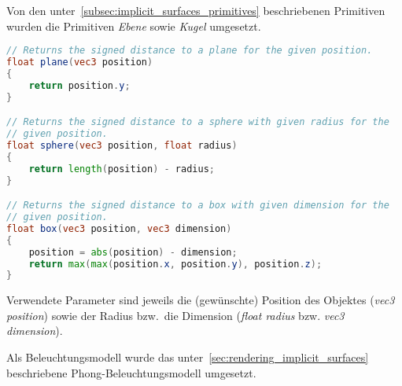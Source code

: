 Von den unter~\autoref{subsec:implicit_surfaces_primitives} beschriebenen
Primitiven wurden die Primitiven \textit{Ebene} sowie \textit{Kugel} umgesetzt.

\begin{minipage}{\linewidth}
\begin{lstlisting}[language=GLSL,caption={Umsetzung der Primitiven
        \textit{Ebene} und \textit{Kugel} in Form von impliziten
        Oberflächen in
        GLSL.},label={alg:glsl_primitives},captionpos=b,emph={plane,sphere,box}]
// Returns the signed distance to a plane for the given position.
float plane(vec3 position)
{
    return position.y;
}

// Returns the signed distance to a sphere with given radius for the
// given position.
float sphere(vec3 position, float radius)
{
    return length(position) - radius;
}

// Returns the signed distance to a box with given dimension for the
// given position.
float box(vec3 position, vec3 dimension)
{
    position = abs(position) - dimension;
    return max(max(position.x, position.y), position.z);
}
\end{lstlisting}
\end{minipage}

Verwendete Parameter sind jeweils die (gewünschte) Position des Objektes
(\textit{vec3 position}) sowie der Radius bzw.\ die Dimension
(\textit{float radius} bzw. \textit{vec3 dimension}).

Als Beleuchtungsmodell wurde das
unter~\autoref{sec:rendering_implicit_surfaces} beschriebene
Phong-Beleuchtungsmodell umgesetzt.

